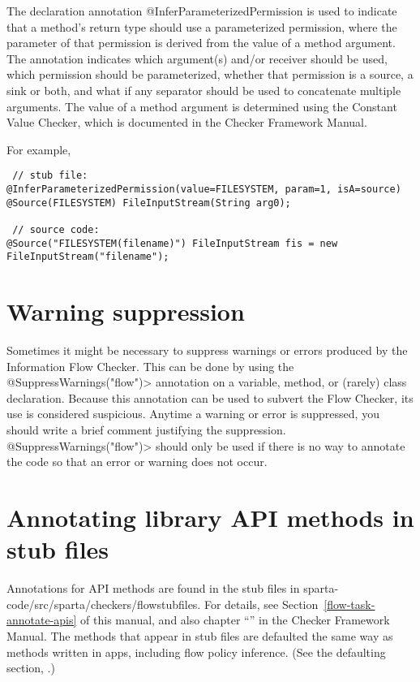  The declaration annotation @InferParameterizedPermission is used to indicate
that a method's return type should use a parameterized permission, where the
parameter of that permission is derived from the value of a method argument.
The annotation indicates which argument(s) and/or receiver should be used,
which permission should be parameterized,  whether that permission is a source,
a sink or both, and what if any separator should be used to concatenate
multiple arguments.   The value of a method argument is determined using the
Constant Value Checker, which is documented in the Checker Framework Manual.
 
 For example, \begin{Verbatim}
 // stub file:
@InferParameterizedPermission(value=FILESYSTEM, param=1, isA=source)
@Source(FILESYSTEM) FileInputStream(String arg0);

 // source code:
@Source("FILESYSTEM(filename)") FileInputStream fis = new FileInputStream("filename");
\end{Verbatim}



\section{Warning suppression\label{sec:waringsuppression}}
 
Sometimes it might be necessary to suppress warnings or errors produced by
the Information Flow Checker.  This can be done by using the
\<@SuppressWarnings("flow")> annotation on a variable, method, or (rarely)
class declaration.  Because this annotation can be used to subvert the Flow
Checker, its use is considered suspicious.  Anytime a warning or error is
suppressed, you should write a brief comment justifying the suppression.
\<@SuppressWarnings("flow")> should only be used if there is no way to
annotate the code so that an error or warning does not occur.  

\section{Annotating library API methods in stub files\label{sec:apispecs}}

Annotations for API methods are found in the stub files in sparta-code/src/sparta/checkers/flowstubfiles.
For details, see Section~\ref{flow-task-annotate-apis} of this manual, and also 
chapter
``'' in the Checker Framework Manual.  
 The methods that appear in stub files are defaulted the same way as methods 
written in apps, including flow policy inference.  
(See the defaulting section, .) 

